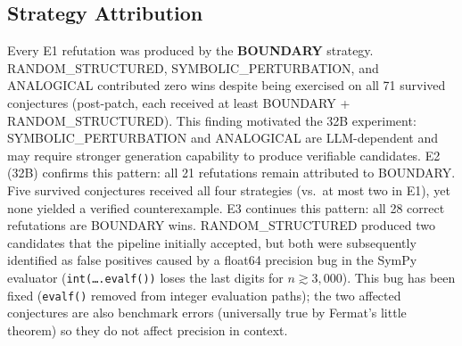 \begin{table}[t]
\centering
\small
\caption{Tier and domain breakdown for E1, E2, and E3. Precision omitted where
$n_{\text{refuted}} = 0$.}
\label{tab:breakdown}

\end{table}

\subsection{Strategy Attribution}

Every E1 refutation was produced by the \textbf{BOUNDARY} strategy.
RANDOM\_STRUCTURED, SYMBOLIC\_PERTURBATION, and ANALOGICAL contributed zero
wins despite being exercised on all 71 survived conjectures (post-patch,
each received at least BOUNDARY + RANDOM\_STRUCTURED).
This finding motivated the 32B experiment: SYMBOLIC\_PERTURBATION and
ANALOGICAL are LLM-dependent and may require stronger generation capability
to produce verifiable candidates.
E2 (32B) confirms this pattern: all 21 refutations remain attributed to
BOUNDARY. Five survived conjectures received all four strategies (vs.\ at most
two in E1), yet none yielded a verified counterexample.
E3 continues this pattern: all 28 correct refutations are BOUNDARY wins.
RANDOM\_STRUCTURED produced two candidates that the pipeline initially
accepted, but both were subsequently identified as false positives caused
by a float64 precision bug in the SymPy evaluator (\texttt{int(\ldots.evalf())}
loses the last digits for $n \gtrsim 3{,}000$).
This bug has been fixed (\texttt{evalf()} removed from integer evaluation paths);
the two affected conjectures are also benchmark errors (universally true
by Fermat's little theorem) so they do not affect precision in context.
